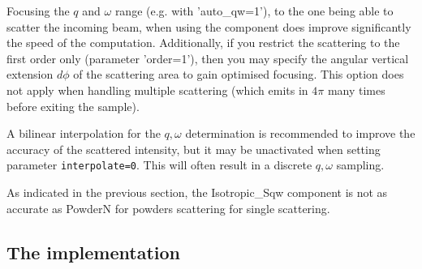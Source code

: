 Focusing the $q$ and $\omega$ range (e.g. with 'auto\_qw=1'), to the one being able to scatter the incoming beam, when using the component does improve significantly the speed of the computation. Additionally, if you restrict the scattering to the first order only (parameter 'order=1'), then you may specify the angular vertical extension $d\phi$ of the scattering area to gain optimised focusing. This option does not apply when handling multiple scattering (which emits in $4\pi$ many times before exiting the sample).

A bilinear interpolation for the $q,\omega$ determination is recommended to improve the accuracy of the scattered intensity, but it may be unactivated when setting parameter \verb+interpolate=0+. This will often result in a discrete $q,\omega$ sampling.

As indicated in the previous section, the Isotropic\_Sqw component is not as accurate as PowderN for powders scattering for single scattering.

\subsection{The implementation}

